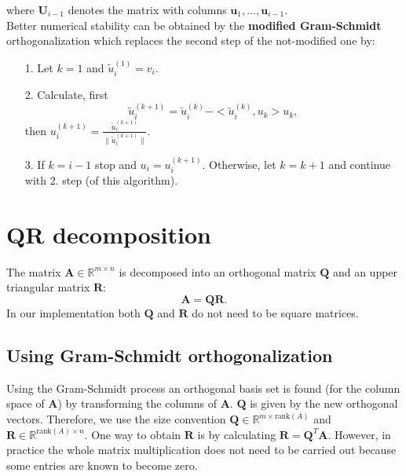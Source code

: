 \documentclass[11pt, a4paper, parskip=half*, bibliography=totoc, cleardoublepage=empty, final,
numbers=noenddot]{scrbook}
\begin{document}
where $\bm{U}_{i-1}$ denotes the matrix with columns $\bm{u}_{1}, ..., \bm{u}_{i-1}$. \\
Better numerical stability can be obtained by the \textbf{modified Gram-Schmidt} orthogonalization which replaces the second step of the not-modified one by:
\begin{itemize}
\item[1.] Let $k=1$ and $\tilde{u}^{(1)}_i = v_i$.
\item[2.] Calculate, first
\begin{equation}
\tilde{u}^{(k+1)}_i = \tilde{u}^{(k)}_i -  <\tilde{u}^{(k)}_i, u_k> u_k     ,
\end{equation} 
then $u^{(k+1)}_i = \frac{\tilde{u}^{(k+1)}_i}{\| \tilde{u}^{(k+1)}_i\|}$.
\item[3.] If $k=i-1$ stop and $u_i = u^{(k+1)}_i$. Otherwise, let $k = k+1$ and continue with 2. step (of this algorithm).
\end{itemize}

\section{QR decomposition}
The matrix $\bm{A} \in \mathbb{R}^{m \times n}$ is decomposed into an orthogonal matrix $\bm{Q}$ and an upper triangular  matrix $\bm{R}$:
\begin{equation}
\bm{A}=\bm{Q} \bm{R}.
\end{equation}
In our implementation both $\bm{Q}$ and $\bm{R}$ do not need to be square matrices. \\
\subsection{Using Gram-Schmidt orthogonalization}
Using the Gram-Schmidt process an orthogonal basis set is found (for the column space of $\bm{A}$) by transforming the columns of $\bm{A}$. $\bm{Q}$ is given by the new orthogonal vectors. Therefore, we use the size convention $\bm{Q} \in \mathbb{R}^{m \times \text{rank}(A)}$ and $\bm{R} \in \mathbb{R}^{\text{rank}(A) \times n}$. One way to obtain $\bm{R}$ is by calculating $\bm{R} = \bm{Q}^T \bm{A}$. However, in practice the whole matrix multiplication does not need to be carried out because some entries are known to become zero.
\end{document}
